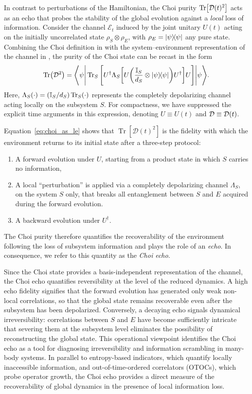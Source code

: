\documentclass[pra,twocolumn,aps,showpacs,superscriptaddress,longbibliography]{revtex4-2}%
\begin{document}
In contrast to perturbations of the Hamiltonian, the Choi purity  $\Tr[\mathcal{D}(t)^2]$ acts as an echo that probes the stability of the global evolution against a \textit{local} loss of information. Consider the channel $\mathcal{E}_t$ induced by the joint unitary $U(t)$ acting on the initially uncorrelated state $\rho_S\otimes\rho_E$, with $\rho_E=\dyad{\psi}$ any pure state. Combining the Choi definition in  with the system–environment representation of the channel in , the purity of the Choi state can be recast in the form
\begin{equation}\label{eq:choi_as_le}
\Tr(\mcD^2) = \Bigg\langle\psi\Bigg|
\Tr_S\Bigg[
U^\dagger \Lambda_S \bqty{
U \pqty{\frac{\mathbb{I}_S}{d_S} \otimes \dyad{\psi} } U^\dagger
} U
\Bigg]
\Bigg|\psi\Bigg\rangle.
\end{equation}
Here, $\Lambda_S(\cdot) = (\mathbb{I}_S/d_S)\Tr_S(\cdot)$ represents the completely depolarizing channel acting locally on the subsystem $S$. 
For compactness, we have suppressed the explicit time arguments in this expression, denoting $U \equiv U(t)$ and $\mathcal{D} \equiv \mathcal{D}(t)$.

Equation~\eqref{eq:choi_as_le} shows that $\operatorname{Tr}[\mathcal{D}(t)^2]$ is the fidelity with which the environment returns to its initial state after a three-step protocol:  
\begin{enumerate}
\item A forward evolution under $U$, starting from a product state in which $S$ carries no information,
\item A local ``perturbation'' is applied via a completely depolarizing channel $\Lambda_S$, on the system $S$ only, that breaks all entanglement between $S$ and $E$ acquired during the forward evolution.
\item A backward evolution under $U^\dagger$.
\end{enumerate}
The Choi purity therefore quantifies the recoverability of the environment following the loss of subsystem information and plays the role of an \textit{echo}. In consequence, we refer to this quantity as the \textit{Choi echo}.

Since the Choi state provides a basis-independent representation of the channel, the Choi echo quantifies reversibility at the level of the reduced dynamics. A high echo fidelity signifies that the forward evolution has generated only weak non-local correlations, so that the global state remains recoverable even after the subsystem has been depolarized. Conversely, a decaying echo signals dynamical irreversibility: correlations between \(S\) and \(E\) have become sufficiently intricate that severing them at the subsystem level eliminates the possibility of reconstructing the global state. This operational viewpoint identifies the Choi echo as a tool for diagnosing irreversibility and information scrambling in many-body systems. In parallel to entropy-based indicators, which quantify locally inaccessible information, and out-of-time-ordered correlators (OTOCs), which probe operator growth, the Choi echo provides a direct measure of the recoverability of global dynamics in the presence of local information loss.
\end{document}
